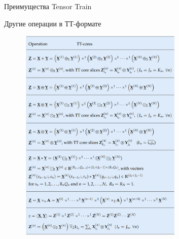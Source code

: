 \begin{frame}{Преимущества Tensor Train}
\begin{itemize}
\end{itemize}

\end{frame}
\begin{frame}{Другие операции в ТТ-формате}
\begin{figure}
    \centering
    \includegraphics[width=0.7\textwidth]{lecture_15/figs/TT_operation.png}
\end{figure}
\end{frame}


